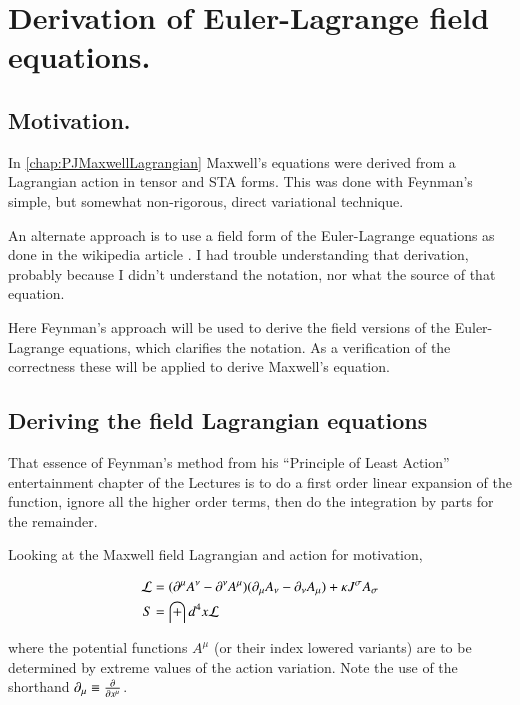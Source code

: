 \chapter{Derivation of Euler-Lagrange field equations.}\label{chap:PJFieldLagrangian}
\date{ October 10, 2008.  Last Revision: $Date: 2009/06/04 13:13:27 $ }

\section{Motivation. }

In \ref{chap:PJMaxwellLagrangian} Maxwell's equations were derived from
a Lagrangian action in tensor and STA forms.  This was done with 
Feynman's \cite{feynman1963flp} simple, but somewhat non-rigorous, direct variational technique.

An alternate approach is to use a field form of the Euler-Lagrange
equations as done in the wikipedia article \cite{wikiemtensor}.  I had
trouble understanding that derivation, probably because
I didn't understand the notation, nor what the source of that equation.

Here Feynman's approach will be used to derive the field versions of the Euler-Lagrange
equations, which clarifies the notation.  As a verification of the correctness these
will be applied to derive Maxwell's equation.

\section{Deriving the field Lagrangian equations }

That essence of Feynman's method from his 
``Principle of Least Action'' entertainment chapter of the Lectures is
to do a first order linear expansion of the function, ignore all the higher order terms,
then do the integration by parts for the remainder.

Looking at the Maxwell field Lagrangian and action for motivation,

\begin{align*}
\mathcal{L} &= (\partial^\mu A^\nu - \partial^\nu A^\mu) (\partial_\mu A_\nu - \partial_\nu A_\mu) + \kappa J^\sigma A_\sigma \\
S &= \int d^4 x \mathcal{L}
\end{align*}

where the potential functions $A^\mu$ (or their index lowered variants)
are to be determined by extreme values of the action variation.  Note the use of the shorthand
$\partial_\mu \equiv \frac{\partial {}}{\partial {x^\mu}}$.

